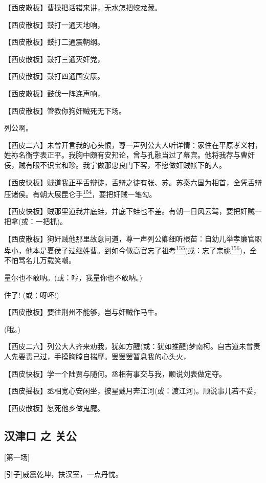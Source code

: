 【西皮散板】曹操把话错来讲，无水怎把蛟龙藏。

【西皮散板】鼓打一通天地响，

【西皮散板】鼓打二通震朝纲。

【西皮散板】鼓打三通灭奸党，

【西皮散板】鼓打四通国安康。

【西皮散板】鼓伐一阵连声响，

【西皮散板】管教你狗奸贼死无下场。

列公啊。

【西皮二六】未曾开言我的心头恨，尊一声列公大人听详情：家住在平原孝义村，姓祢名衡字表正平。我胸中颇有安邦论，曾与孔融当过了幕宾。他将我荐与曹奸佞，贼有眼不识宝和珍。我宁做那忠良门下客，不愿做奸贼帐下的人。

【西皮快板】贼道我正平舌辩徒，舌辩之徒有张、苏。苏秦六国为相首，全凭舌辩压诸侯。有朝大展昆仑手\protect\hyperlink{fn154}{\textsuperscript{154}}，要把奸贼一笔勾。

【西皮快板】贼那里道我井底蛙，井底下蛙也不差。有朝一日风云驾，要把奸贼一把拿(或：一把抓)。

【西皮散板】狗奸贼他那里故意问道，尊一声列公卿细听根苗：自幼儿举孝廉官职卑小，他本是夏侯子过继姓曹。到如今做高官忘了祖考\protect\hyperlink{fn155}{\textsuperscript{155}}(或：忘了宗祧\protect\hyperlink{fn156}{\textsuperscript{156}})，全不怕骂名儿万载笑嘲。

量尔也不敢呐。(或：哼，我量你也不敢呐。)

住了! (或：呀呸!)

【西皮散板】要往荆州不能够，岂与奸贼作马牛。

(哦。)

【西皮二六】列公大人齐来劝我，犹如方醒(或：犹如推醒)梦南柯。自古道未曾责人先要责己过，手摸胸膛自揣摩。罢罢罢暂息我的心头火，

【西皮快板】学一个陆贾与随何。丞相有事交与我，顺说刘表做定夺。

【西皮摇板】丞相宽心安闲坐，披星戴月奔江河(或：渡江河)。顺说事儿若不妥，

【西皮散板】愿死他乡做鬼魔。

\hypertarget{ux6c49ux6d25ux53e3-ux4e4b-ux5173ux516c}{%
\subsection{汉津口 之
关公}\label{ux6c49ux6d25ux53e3-ux4e4b-ux5173ux516c}}

{[}第一场{]}

{[}引子{]}威震乾坤，扶汉室，一点丹忱。

